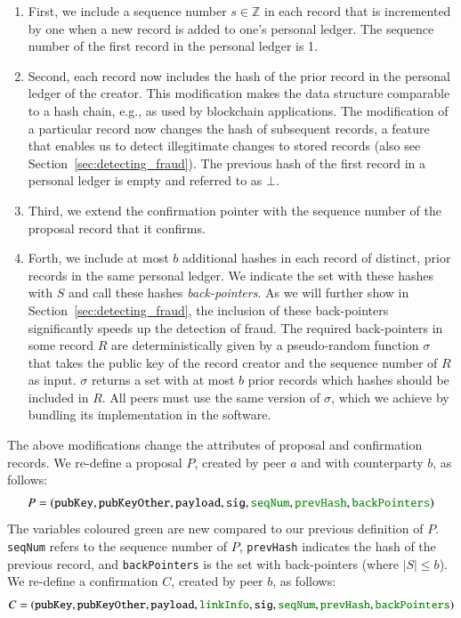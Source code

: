 \begin{enumerate}
	\item First, we include a sequence number $ s \in \mathbb{Z} $ in each record that is incremented by one when a new record is added to one's personal ledger.
	The sequence number of the first record in the personal ledger is 1.
	\item Second, each record now includes the hash of the prior record in the personal ledger of the creator.
	This modification makes the \ModelName{} data structure comparable to a hash chain, e.g., as used by blockchain applications.
	The modification of a particular record now changes the hash of subsequent records, a feature that enables us to detect illegitimate changes to stored records (also see Section~\ref{sec:detecting_fraud}).
	The previous hash of the first record in a personal ledger is empty and referred to as $ \bot $.
	\item Third, we extend the confirmation pointer with the sequence number of the proposal record that it confirms.
	\item Forth, we include at most $ b $ additional hashes in each record of distinct, prior records in the same personal ledger.
	We indicate the set with these hashes with $ S $ and call these hashes \emph{back-pointers}.
	As we will further show in Section~\ref{sec:detecting_fraud}, the inclusion of these back-pointers significantly speeds up the detection of fraud.
	The required back-pointers in some record $ R $ are deterministically given by a pseudo-random function $ \sigma $ that takes the public key of the record creator and the sequence number of $ R $ as input.
	$ \sigma $ returns a set with at most $ b $ prior records which hashes should be included in $ R $.
	All peers must use the same version of $ \sigma $, which we achieve by bundling its implementation in the \ModelName{} software.
\end{enumerate}

The above modifications change the attributes of proposal and confirmation records.
We re-define a proposal $ P $, created by peer $ a $ and with counterparty $ b $, as follows:
\begin{align*}
	P = (\texttt{pubKey}, \texttt{pubKeyOther}, \texttt{payload}, \texttt{sig}, \textcolor{ao}{\texttt{seqNum}}, \textcolor{ao}{\texttt{prevHash}}, \textcolor{ao}{\texttt{backPointers}})
\end{align*}
The variables coloured green are new compared to our previous definition of $ P $.
\texttt{seqNum} refers to the sequence number of $ P $, \texttt{prevHash} indicates the hash of the previous record, and \texttt{backPointers} is the set with back-pointers (where $ |S| \leq b $).
We re-define a confirmation $ C $, created by peer $ b $, as follows:
\begin{align*}
	C = (\texttt{pubKey}, \texttt{pubKeyOther}, \texttt{payload}, \textcolor{ao}{\texttt{linkInfo}}, \texttt{sig},
	\textcolor{ao}{\texttt{seqNum}}, \textcolor{ao}{\texttt{prevHash}}, \textcolor{ao}{\texttt{backPointers}})
\end{align*}

